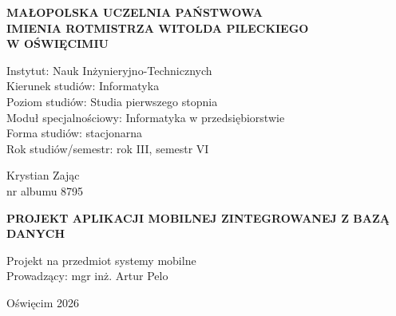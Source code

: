 \thispagestyle{empty}

\begin{center}
    \vspace*{-1cm} %
    
    {\Large\textbf{\selectfont
        MAŁOPOLSKA UCZELNIA PAŃSTWOWA \\
        IMIENIA ROTMISTRZA WITOLDA PILECKIEGO \\
        W OŚWIĘCIMIU} \\[2.5em]} %
        \vspace{0.5cm}
            \begin{flushleft}
                {\normalsize
                \hspace*{3cm} Instytut: Nauk Inżynieryjno-Technicznych \\[1em]
                \hspace*{3cm} Kierunek studiów: Informatyka \\[1em]
                \hspace*{3cm} Poziom studiów: Studia pierwszego stopnia \\[1em]
                \hspace*{3cm} Moduł specjalnościowy: Informatyka w przedsiębiorstwie \\[1em]
                \hspace*{3cm} Forma studiów: stacjonarna \\[1em]
                \hspace*{3cm} Rok studiów/semestr: rok III, semestr VI}
            \end{flushleft}
        
        \vspace{1cm}
    
    {\normalsize
    Krystian Zając \\[1em]
    nr albumu 8795}
    
    \vspace{1cm}
    
    {\Large\textbf{\selectfont
    PROJEKT APLIKACJI MOBILNEJ ZINTEGROWANEJ Z BAZĄ DANYCH}}
    
    \vspace{3cm}
    
    \begin{center}
    {\normalsize
    \hspace*{9cm}Projekt na przedmiot systemy mobilne \\[0.5em]
    \hspace*{9cm}Prowadzący: mgr inż. Artur Pelo \\[0.5em]}
    \end{center}
    
    \vfill
    \vspace{3cm}
   
    {\normalsize
    Oświęcim 2026}
    
\end{center}

\newpage